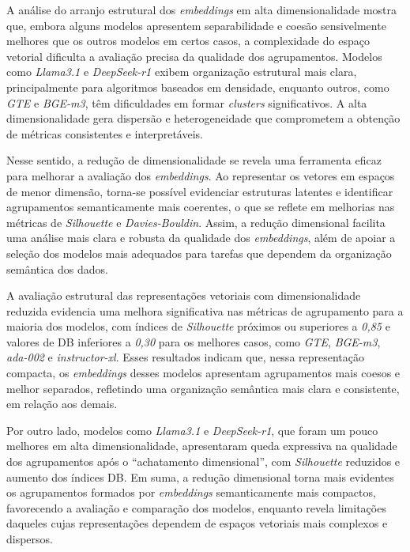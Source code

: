 A análise do arranjo estrutural dos \textit{embeddings} em alta dimensionalidade mostra que, embora alguns modelos apresentem separabilidade e coesão sensivelmente melhores que os outros modelos em certos casos, a complexidade do espaço vetorial dificulta a avaliação precisa da qualidade dos agrupamentos. Modelos como \textit{Llama3.1} e \textit{DeepSeek-r1} exibem organização estrutural mais clara, principalmente para algoritmos baseados em densidade, enquanto outros, como \textit{GTE} e \textit{BGE-m3}, têm dificuldades em formar \textit{clusters} significativos. A alta dimensionalidade gera dispersão e heterogeneidade que comprometem a obtenção de métricas consistentes e interpretáveis.

Nesse sentido, a redução de dimensionalidade se revela uma ferramenta eficaz para melhorar a avaliação dos \textit{embeddings}. Ao representar os vetores em espaços de menor dimensão, torna-se possível evidenciar estruturas latentes e identificar agrupamentos semanticamente mais coerentes, o que se reflete em melhorias nas métricas de \textit{Silhouette} e \textit{Davies-Bouldin}. Assim, a redução dimensional facilita uma análise mais clara e robusta da qualidade dos \textit{embeddings}, além de apoiar a seleção dos modelos mais adequados para tarefas que dependem da organização semântica dos dados.

A avaliação estrutural das representações vetoriais com dimensionalidade reduzida evidencia uma melhora significativa nas métricas de agrupamento para a maioria dos modelos, com índices de \textit{Silhouette} próximos ou superiores a \textit{0,85} e valores de DB inferiores a \textit{0,30} para os melhores casos, como \textit{GTE}, \textit{BGE-m3}, \textit{ada-002} e \textit{instructor-xl}. Esses resultados indicam que, nessa representação compacta, os \textit{embeddings} desses modelos apresentam agrupamentos mais coesos e melhor separados, refletindo uma organização semântica mais clara e consistente, em relação aos demais.

Por outro lado, modelos como \textit{Llama3.1} e \textit{DeepSeek-r1}, que foram um pouco melhores em alta dimensionalidade, apresentaram queda expressiva na qualidade dos agrupamentos após o ``achatamento dimensional'', com \textit{Silhouette} reduzidos e aumento dos índices DB. Em suma, a redução dimensional torna mais evidentes os agrupamentos formados por \textit{embeddings} semanticamente mais compactos, favorecendo a avaliação e comparação dos modelos, enquanto revela limitações daqueles cujas representações dependem de espaços vetoriais mais complexos e dispersos.

